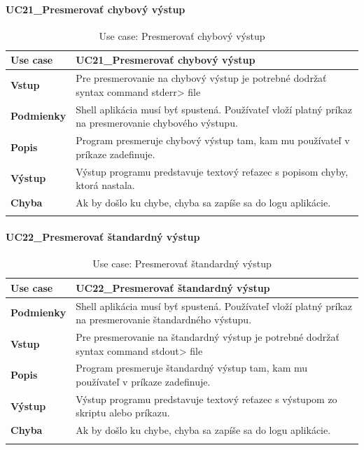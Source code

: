 \paragraph{UC21\_Presmerovať chybový výstup}
\begin{center}
	\begin{longtable}{|p{2.5cm}|p{12.2cm}|}
		
			\hline
			\textbf{Use case} & UC21\_Presmerovať chybový výstup \\ 
			\hline
			\textbf{Vstup} & Pre presmerovanie na chybový výstup je potrebné dodržať syntax command stderr> file\\
			\hline
			\textbf{Podmienky} & Shell aplikácia musí byť spustená. Používateľ vloží platný príkaz na presmerovanie chybového výstupu. \\ 
			\hline
			\textbf{Popis} & Program presmeruje chybový výstup tam, kam mu používateľ v príkaze zadefinuje. \\ 
			\hline
			\textbf{Výstup} & Výstup programu predstavuje textový reťazec s popisom chyby, ktorá nastala.\\
			\hline
			\textbf{Chyba} & Ak by došlo ku chybe, chyba sa zapíše sa do logu aplikácie.\\
			\hline
		\caption{Use case: Presmerovať chybový výstup}
		\label{table:1}
		
	\end{longtable}
\end{center}
\paragraph{UC22\_Presmerovať štandardný výstup}
\begin{center}
	\begin{longtable}{|p{2.5cm}|p{12.2cm}|}
		
			\hline
			\textbf{Use case} & UC22\_Presmerovať štandardný výstup \\ 
			\hline
			\textbf{Podmienky} & Shell aplikácia musí byť spustená. Používateľ vloží platný príkaz na presmerovanie štandardného výstupu. \\ 
			\hline
			\textbf{Vstup} & Pre presmerovanie na štandardný výstup je potrebné dodržať syntax command stdout> file\\
			\hline
			\textbf{Popis} & Program presmeruje štandardný výstup tam, kam mu používateľ v príkaze zadefinuje.\\ 
			\hline
			\textbf{Výstup} & Výstup programu predstavuje textový reťazec s výstupom zo skriptu alebo príkazu.\\
			\hline
			\textbf{Chyba} & Ak by došlo ku chybe, chyba sa zapíše sa do logu aplikácie.\\
			\hline
		\caption{Use case: Presmerovať štandardný výstup }
		\label{table:1}
		
	\end{longtable}
\end{center}



